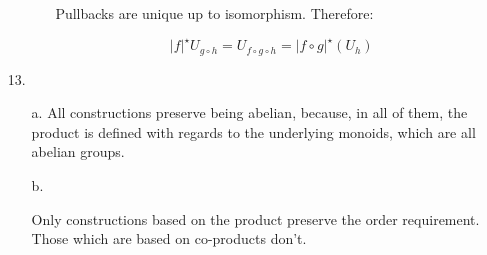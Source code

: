\documentclass{article}
\begin{document}
\begin{enumerate}
\begin{itemize}
\begin{itemize}
          Pullbacks are unique up to isomorphism. Therefore:

          $$ \vert f \vert^\star U_{g\circ h} = U_{f \circ g \circ h} = \vert f \circ g \vert^\star (U_h)$$

        \end{itemize}
        
   \end{itemize}

   \item[13.]

     \begin{enumerate}

       \item[a.]
     All constructions preserve being abelian, because, in all of them,
     the product is defined with regards to the underlying monoids,
     which are all abelian groups.

     \item[b.]

       Only constructions based on the product preserve the order
       requirement. Those which are based on co-products don't.

    \end{enumerate}

\end{enumerate}
\end{document}
